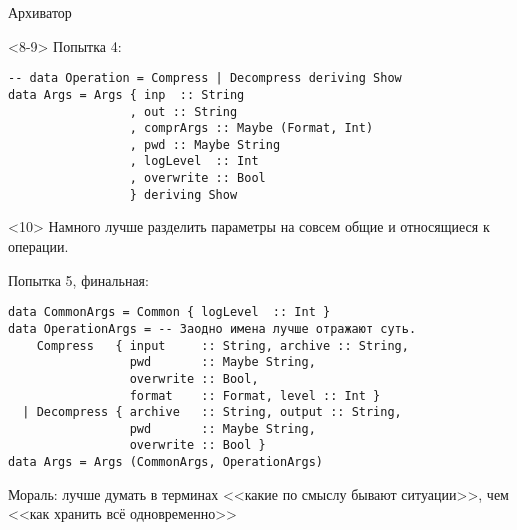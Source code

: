 \begin{frame}[t,fragile]{Архиватор}
\begin{onlyenv}<8-9>
Попытка 4:
\begin{verbatim}
-- data Operation = Compress | Decompress deriving Show
data Args = Args { inp  :: String
                 , out :: String
                 , comprArgs :: Maybe (Format, Int)
                 , pwd :: Maybe String
                 , logLevel  :: Int
                 , overwrite :: Bool
                 } deriving Show
\end{verbatim}
\end{onlyenv}

\begin{onlyenv}<10>
Намного лучше разделить параметры на совсем общие и относящиеся к операции.

Попытка 5, финальная:
\begin{verbatim}
data CommonArgs = Common { logLevel  :: Int }
data OperationArgs = -- Заодно имена лучше отражают суть.
    Compress   { input     :: String, archive :: String,
                 pwd       :: Maybe String,
                 overwrite :: Bool,
                 format    :: Format, level :: Int }
  | Decompress { archive   :: String, output :: String,
                 pwd       :: Maybe String,
                 overwrite :: Bool }
data Args = Args (CommonArgs, OperationArgs)
\end{verbatim}
Мораль: лучше думать в терминах <<какие по смыслу бывают ситуации>>, чем
<<как хранить всё одновременно>>
\end{onlyenv}
\end{frame}

